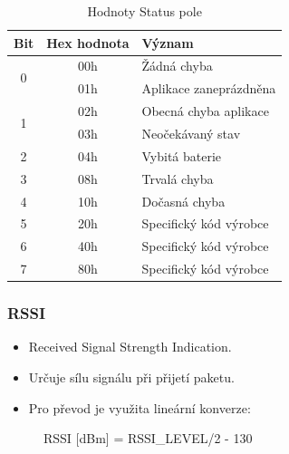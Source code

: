 				\begin{table}[!ht]
				\centering
				\vspace{-30pt}
				\caption{Hodnoty Status pole}
				\label{def_status}
				\begin{tabular}{|c|c|l|}
				\hline
				\textbf{Bit}       & \textbf{Hex hodnota} & \textbf{Význam}        \\ \hline \hline
				\multirow{2}{*}{0} & 00h                  & Žádná chyba            \\ \cline{2-3} 
													 & 01h                  & Aplikace zaneprázdněna \\ \hline
				\multirow{2}{*}{1} & 02h                  & Obecná chyba aplikace  \\ \cline{2-3} 
													 & 03h                  & Neočekávaný stav       \\ \hline
				2                  & 04h                  & Vybitá baterie         \\ \hline
				3                  & 08h                  & Trvalá chyba           \\ \hline
				4                  & 10h                  & Dočasná chyba          \\ \hline
				5                  & 20h                  & Specifický kód výrobce \\ \hline
				6                  & 40h                  & Specifický kód výrobce \\ \hline
				7                  & 80h                  & Specifický kód výrobce \\ \hline \hline
				\end{tabular}
				\end{table}

\subsubsection{RSSI}
\begin{itemize}
	\item Received Signal Strength Indication.
	\item Určuje sílu signálu při přijetí paketu.
	\item Pro převod je využita lineární konverze:
\end{itemize}	
				\begin{figure}[!ht]
				\begin{centerverbatim}
				RSSI [dBm] = RSSI_LEVEL/2 - 130
				\end{centerverbatim}
			\end{figure}
			\vspace{-30pt}
	
